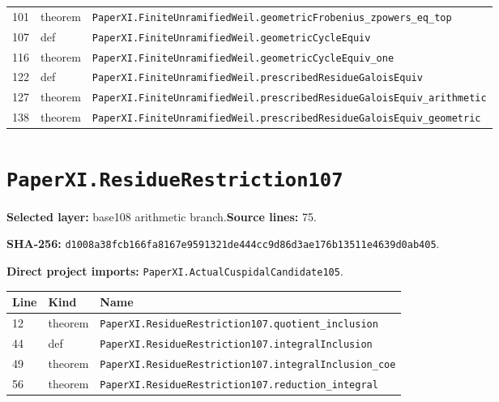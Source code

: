 \documentclass[10pt,oneside]{book}
\begin{document}
\begin{longtable}{@{}p{}p{}p{}@{}}
101&theorem&\nolinkurl{PaperXI.FiniteUnramifiedWeil.geometricFrobenius_zpowers_eq_top}\\

107&def&\nolinkurl{PaperXI.FiniteUnramifiedWeil.geometricCycleEquiv}\\

116&theorem&\nolinkurl{PaperXI.FiniteUnramifiedWeil.geometricCycleEquiv_one}\\

122&def&\nolinkurl{PaperXI.FiniteUnramifiedWeil.prescribedResidueGaloisEquiv}\\

127&theorem&\nolinkurl{PaperXI.FiniteUnramifiedWeil.prescribedResidueGaloisEquiv_arithmetic}\\

138&theorem&\nolinkurl{PaperXI.FiniteUnramifiedWeil.prescribedResidueGaloisEquiv_geometric}\\

\bottomrule\end{longtable}

\section{\texorpdfstring{\nolinkurl{PaperXI.ResidueRestriction107}}{PaperXI.ResidueRestriction107}}\label{module:PaperXI.ResidueRestriction107}

\textbf{Selected layer:} base108 arithmetic branch.\quad\textbf{Source lines:} 75.\par\textbf{SHA-256:} {\scriptsize\nolinkurl{d1008a38fcb166fa8167e9591321de444cc9d86d3ae176b13511e4639d0ab405}}.


\textbf{Direct project imports:} \nolinkurl{PaperXI.ActualCuspidalCandidate105}.

\begin{longtable}{@{}p{}p{}p{}@{}}\toprule Line&Kind&Name\\\midrule\endhead

12&theorem&\nolinkurl{PaperXI.ResidueRestriction107.quotient_inclusion}\\

44&def&\nolinkurl{PaperXI.ResidueRestriction107.integralInclusion}\\

49&theorem&\nolinkurl{PaperXI.ResidueRestriction107.integralInclusion_coe}\\

56&theorem&\nolinkurl{PaperXI.ResidueRestriction107.reduction_integral}\\

\bottomrule\end{longtable}
\end{document}
